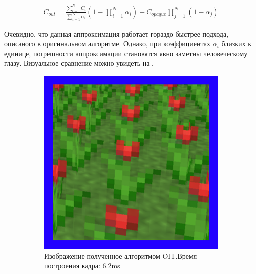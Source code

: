 			\begin{equation}
				\label{eq:wboit-formula}
				\begin{multlined}	 
					C_{out} = \frac{\sum_{i=1}^{N}C_i}{\sum_{i=1}^{N}\alpha_i}(1 - \prod_{i=1}^{N}\alpha_i) + 
					C_{opaque}\prod _{j=1}^{N}(1 - \alpha_j)   
				\end{multlined}
			\end{equation}
			
			Очевидно, что данная аппроксимация работает гораздо быстрее подхода, описаного в оригинальном алгоритме. Однако, при коэффициентах $\alpha_i$ близких к единице, погрешности аппроксимации становятся явно заметны человеческому глазу. Визуальное сравнение можно увидеть на .
			
			\begin{figure}[!htbp]
				\centering
				\begin{subfigure}[b]{0.3\textwidth}
					\centering
					\includegraphics[width=\textwidth]{my_folder/images//oit_flower}
					\caption{Изображение полученное алгоритмом OIT.\linebreak Время построения кадра: 6.2ms}
					\label{fig:oit_flower}
				\end{subfigure}
				\begin{subfigure}[b]{0.3\textwidth}
					\centering

\end{subfigure}
\end{figure}
